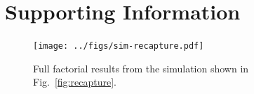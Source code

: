 \documentclass[12pt,english]{article}
\begin{document}
\clearpage

\section{Supporting Information}

\renewcommand{\thefigure}{S\arabic{figure}}
\renewcommand{\thetable}{S\arabic{table}}
\setcounter{figure}{0}
\setcounter{table}{0}

\begin{figure}[htb]
\begin{center}
  \texttt{[image: ../figs/sim-recapture.pdf]}
\caption{
  Full factorial results from the simulation shown in Fig.~\ref{fig:recapture}.
}
\label{fig:recapture-factorial}
\end{center}
\end{figure}
\end{document}
